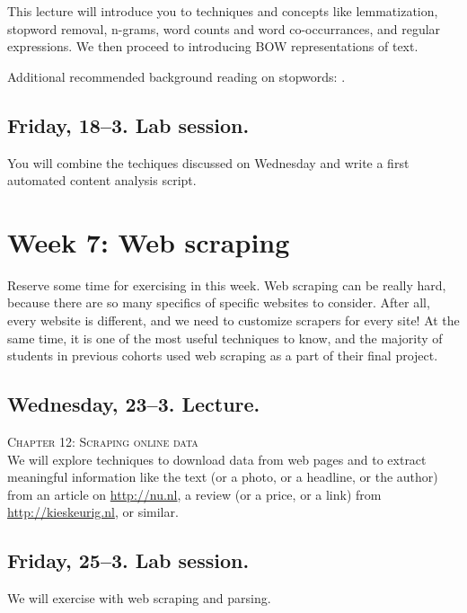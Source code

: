 This lecture will introduce you to techniques and concepts like lemmatization, stopword removal, n-grams, word counts and word co-occurrances, and regular expressions. We then proceed to introducing BOW representations of text.

Additional recommended background reading on stopwords: \cite{Nothman2018}.


\subsection*{Friday, 18--3. Lab session.}
You will combine the techiques discussed on Wednesday and write a first automated content analysis script.








\section*{Week 7: Web scraping}
Reserve some time for exercising in this week. Web scraping can be really hard, because there are so many specifics of specific websites to consider. After all, every website is different, and we need to customize scrapers for every site! At the same time, it is one of the most useful techniques to know, and the majority of students in previous cohorts used web scraping as a part of their final project.


\subsection*{Wednesday, 23--3. Lecture.}
\textsc{ Chapter 12: Scraping online data}\\
We will explore techniques to download data from web pages and to extract meaningful information like the text (or a photo, or a headline, or the author) from an article on \url{http://nu.nl}, a review (or a price, or a link) from \url{http://kieskeurig.nl}, or similar.

\subsection*{Friday, 25--3. Lab session.}
We will exercise with web scraping and parsing.






